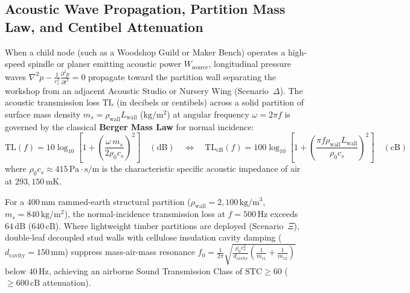 \subsection{Acoustic Wave Propagation, Partition Mass Law, and Centibel Attenuation}
When a child node (such as a Woodshop Guild or Maker Bench) operates a high-speed spindle or planer emitting acoustic power $W_{\mathrm{source}}$, longitudinal pressure waves $\nabla^2 p - \frac{1}{c_s^2}\frac{\partial^2 p}{\partial t^2} = 0$ propagate toward the partition wall separating the workshop from an adjacent Acoustic Studio or Nursery Wing (Scenario~$\Delta$). The acoustic transmission loss $\mathrm{TL}$ (in decibels or centibels) across a solid partition of surface mass density $m_s = \rho_{\mathrm{wall}} L_{\mathrm{wall}}$ ($\mathrm{kg/m^2}$) at angular frequency $\omega = 2\pi f$ is governed by the classical \textbf{Berger Mass Law} for normal incidence:
\begin{equation}
\mathrm{TL}(f) = 10 \log_{10} \left[ 1 + \left( \frac{\omega \, m_s}{2 \rho_0 c_s} \right)^2 \right] \quad (\mathrm{dB}) \quad \Longleftrightarrow \quad \mathrm{TL}_{\mathrm{cB}}(f) = 100 \log_{10} \left[ 1 + \left( \frac{\pi f \rho_{\mathrm{wall}} L_{\mathrm{wall}}}{\rho_0 c_s} \right)^2 \right] \quad (\mathrm{cB})
\label{eq:acoustic_mass_law}
\end{equation}
where $\rho_0 c_s \approx 415\,\mathrm{Pa\cdot s/m}$ is the characteristic specific acoustic impedance of air at $293{,}150\,\mathrm{mK}$.

For a $400\,\mathrm{mm}$ rammed-earth structural partition ($\rho_{\mathrm{wall}} = 2{,}100\,\mathrm{kg/m^3}$, $m_s = 840\,\mathrm{kg/m^2}$), the normal-incidence transmission loss at $f = 500\,\mathrm{Hz}$ exceeds $64\,\mathrm{dB}$ ($640\,\mathrm{cB}$). Where lightweight timber partitions are deployed (Scenario~$\Xi$), double-leaf decoupled stud walls with cellulose insulation cavity damping ($d_{\mathrm{cavity}} = 150\,\mathrm{mm}$) suppress mass-air-mass resonance $f_0 = \frac{1}{2\pi}\sqrt{\frac{\rho_0 c_s^2}{d_{\mathrm{cavity}}}\left(\frac{1}{m_{s1}} + \frac{1}{m_{s2}}\right)}$ below $40\,\mathrm{Hz}$, achieving an airborne Sound Transmission Class of $\mathrm{STC} \ge 60$ ($\ge 600\,\mathrm{cB}$ attenuation).

